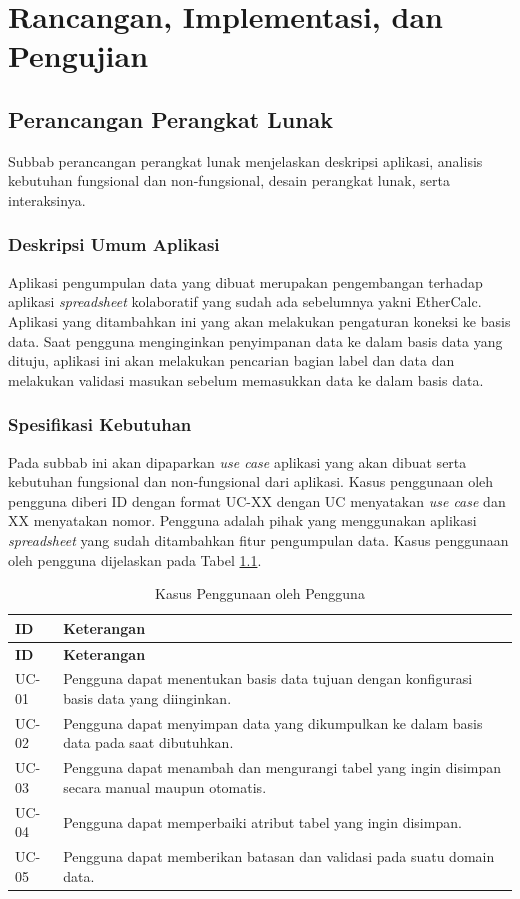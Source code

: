 \chapter{Rancangan, Implementasi, dan Pengujian}

\section{Perancangan Perangkat Lunak}
Subbab perancangan perangkat lunak menjelaskan deskripsi aplikasi, analisis kebutuhan fungsional dan non-fungsional, desain perangkat lunak, serta interaksinya.

	\subsection{Deskripsi Umum Aplikasi}
	Aplikasi pengumpulan data yang dibuat merupakan pengembangan terhadap aplikasi \textit{spreadsheet} kolaboratif yang sudah ada sebelumnya yakni EtherCalc. Aplikasi yang ditambahkan ini yang akan melakukan pengaturan koneksi ke basis data. Saat pengguna menginginkan penyimpanan data ke dalam basis data yang dituju, aplikasi ini akan melakukan pencarian bagian label dan data dan melakukan validasi masukan sebelum memasukkan data ke dalam basis data. 

	\subsection{Spesifikasi Kebutuhan}
	Pada subbab ini akan dipaparkan \textit{use case} aplikasi yang akan dibuat serta kebutuhan fungsional dan non-fungsional dari aplikasi. Kasus penggunaan oleh pengguna diberi ID dengan format UC-XX dengan UC menyatakan \textit{use case} dan XX menyatakan nomor. Pengguna adalah pihak yang menggunakan aplikasi \textit{spreadsheet} yang sudah ditambahkan fitur pengumpulan data. Kasus penggunaan oleh pengguna dijelaskan pada Tabel \ref{KebutuhanPengguna}.

	\begin{small}
	\begin{longtable}{ | p{2cm} | p{10cm} | }
	    \caption{Kasus Penggunaan oleh Pengguna}
	    \label{KebutuhanPengguna}\\ \hline
	    \centering\bfseries{ID} & \centering\bfseries{Keterangan} \tabularnewline \hline
	    \endfirsthead
	    \hline
	    \centering\bfseries{ID} & \centering\bfseries{Keterangan} \tabularnewline \hline
	    \endhead
	    UC-01 & Pengguna dapat menentukan basis data tujuan dengan konfigurasi basis data yang diinginkan. \\ \hline
	    UC-02 & Pengguna dapat menyimpan data yang dikumpulkan ke dalam basis data pada saat dibutuhkan. \\ \hline
	    UC-03 & Pengguna dapat menambah dan mengurangi tabel yang ingin disimpan secara manual maupun otomatis. \\ \hline
	    UC-04 & Pengguna dapat memperbaiki atribut tabel yang ingin disimpan. \\ \hline
	    UC-05 & Pengguna dapat memberikan batasan dan validasi pada suatu domain data. \\ \hline
	\end{longtable}
	\end{small}

